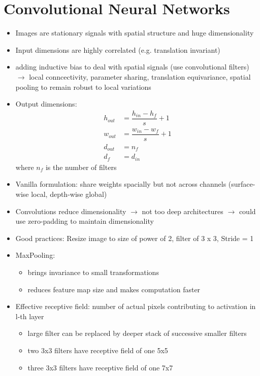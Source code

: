 \section{Convolutional Neural Networks}
\begin{itemize}
	\item Images are stationary signals with spatial structure and huge dimensionality
	\item Input dimensions are highly correlated (e.g. translation invariant)
	\item adding inductive bias to deal with spatial signals (use convolutional filters) $\rightarrow$ local conncectivity, parameter sharing, translation equivariance, spatial pooling to remain robust to local variations
	\item Output dimensions: $$\begin{aligned} h_{out} &= \dfrac{h_{in}-h_f}{s} + 1 \\ w_{out} &= \dfrac{w_{in}-w_f}{s} + 1 \\ d_{out} &= n_f \\ d_f &= d_{in} \end{aligned}$$ where $n_f$ is the number of filters
	\item Vanilla formulation: share weights spacially but not across channels (surface-wise local, depth-wise global)
	\item Convolutions reduce dimensionality $\rightarrow$ not too deep architectures $\rightarrow$ could use zero-padding to maintain dimensionality
	\item Good practices: Resize image to size of power of 2, filter of 3 x 3, Stride = 1
	\item MaxPooling:
	\begin{itemize}
		\item brings invariance to small transformations
		\item reduces feature map size and makes computation faster
	\end{itemize}
	\item Effective receptive field: number of actual pixels contributing to activation in l-th layer
	\begin{itemize}
		\item large filter can be replaced by deeper stack of successive smaller filters
		\item two 3x3 filters have receptive field of one 5x5
		\item three 3x3 filters have receptive field of one 7x7
	\end{itemize}
\end{itemize}
